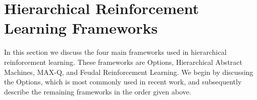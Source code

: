 \section{Hierarchical Reinforcement Learning Frameworks}
In this section we discuss the four main frameworks used in hierarchical
reinforcement learning. These frameworks are Options, Hierarchical Abstract Machines,
MAX-Q, and Feudal Reinforcement Learning. We begin by discussing the Options,
which is most commonly used in recent work, and subsequently describe the
remaining frameworks in the order given above.
